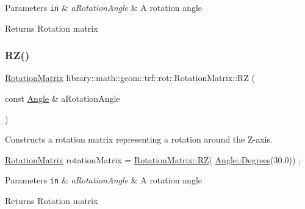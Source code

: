 \begin{DoxyParams}[1]{Parameters}
\mbox{\tt in}  & {\em a\+Rotation\+Angle} & A rotation angle \\
\hline
\end{DoxyParams}
\begin{DoxyReturn}{Returns}
Rotation matrix 
\end{DoxyReturn}
\mbox{\label{classlibrary_1_1math_1_1geom_1_1trf_1_1rot_1_1_rotation_matrix_a357a0cf34802e55ac7221d5d1fd839c9}} 
\subsubsection{\texorpdfstring{R\+Z()}{RZ()}}
{\footnotesize\ttfamily \hyperlink{classlibrary_1_1math_1_1geom_1_1trf_1_1rot_1_1_rotation_matrix}{Rotation\+Matrix} library\+::math\+::geom\+::trf\+::rot\+::\+Rotation\+Matrix\+::\+RZ (\begin{DoxyParamCaption}\item[{const \hyperlink{classlibrary_1_1math_1_1geom_1_1_angle}{Angle} \&}]{a\+Rotation\+Angle }\end{DoxyParamCaption})\hspace{0.3cm}{\ttfamily [static]}}



Constructs a rotation matrix representing a rotation around the Z-\/axis. 


\begin{DoxyCode}
\hyperlink{classlibrary_1_1math_1_1geom_1_1trf_1_1rot_1_1_rotation_matrix_a667d2c05aa5b0cc88775938d11164cdc}{RotationMatrix} rotationMatrix = \hyperlink{classlibrary_1_1math_1_1geom_1_1trf_1_1rot_1_1_rotation_matrix_a357a0cf34802e55ac7221d5d1fd839c9}{RotationMatrix::RZ}(
      \hyperlink{classlibrary_1_1math_1_1geom_1_1_angle_a64aa53e8420aeb6f671d86c65c370bc8}{Angle::Degrees}(30.0)) ;
\end{DoxyCode}



\begin{DoxyParams}[1]{Parameters}
\mbox{\tt in}  & {\em a\+Rotation\+Angle} & A rotation angle \\
\hline
\end{DoxyParams}
\begin{DoxyReturn}{Returns}
Rotation matrix 
\end{DoxyReturn}
\mbox{\label{classlibrary_1_1math_1_1geom_1_1trf_1_1rot_1_1_rotation_matrix_aafb93f71d64ff383a58a9b9c4816a117}} 
